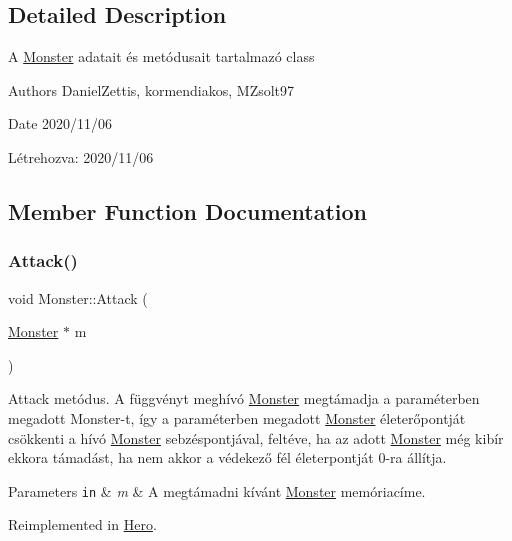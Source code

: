 \subsection{Detailed Description}
A \hyperlink{classMonster}{Monster} adatait és metódusait tartalmazó class

\begin{DoxyAuthor}{Authors}
Daniel\+Zettis, kormendiakos, M\+Zsolt97
\end{DoxyAuthor}
\begin{DoxyDate}{Date}
2020/11/06
\end{DoxyDate}
Létrehozva\+: 2020/11/06 

\subsection{Member Function Documentation}
\mbox{\label{classMonster_a8de70695e71755873f1f3cc0c78ef549}} 
\subsubsection{\texorpdfstring{Attack()}{Attack()}}
{\footnotesize\ttfamily void Monster\+::\+Attack (\begin{DoxyParamCaption}\item[{\hyperlink{classMonster}{Monster} $\ast$}]{m }\end{DoxyParamCaption})\hspace{0.3cm}{\ttfamily [virtual]}}



Attack metódus. A függvényt meghívó \hyperlink{classMonster}{Monster} megtámadja a paraméterben megadott Monster-\/t, így a paraméterben megadott \hyperlink{classMonster}{Monster} életerőpontját csökkenti a hívó \hyperlink{classMonster}{Monster} sebzéspontjával, feltéve, ha az adott \hyperlink{classMonster}{Monster} még kibír ekkora támadást, ha nem akkor a védekező fél életerpontját 0-\/ra állítja. 


\begin{DoxyParams}[1]{Parameters}
\mbox{\tt in}  & {\em m} & A megtámadni kívánt \hyperlink{classMonster}{Monster} memóriacíme. \\
\hline
\end{DoxyParams}


Reimplemented in \hyperlink{classHero_a4c2c5bcf53b4fa4cb931d9930e3f0844}{Hero}.

